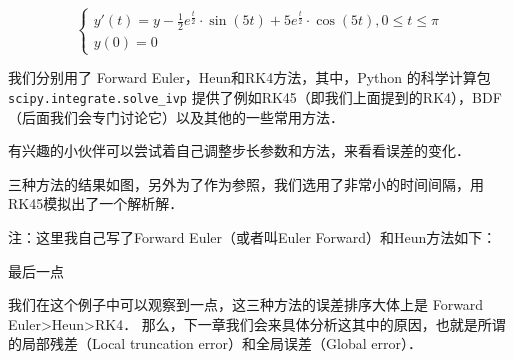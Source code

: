 \begin{equation}
\begin{cases}
 y'(t) = y-\frac{1}{2}e^{\frac{t}{2}}\cdot\sin(5t)+5e^{\frac{t}{2}}\cdot\cos(5t), 0\le t\le \pi\\     y(0)=0
\end{cases}
\end{equation}

我们分别用了 Forward Euler，Heun和RK4方法，其中，Python 的科学计算包 \verb|scipy.integrate.solve_ivp|   提供了例如RK45（即我们上面提到的RK4），BDF（后面我们会专门讨论它）以及其他的一些常用方法．

有兴趣的小伙伴可以尝试着自己调整步长参数和方法，来看看误差的变化．


三种方法的结果如图，另外为了作为参照，我们选用了非常小的时间间隔，用RK45模拟出了一个解析解．

注：这里我自己写了Forward Euler（或者叫Euler Forward）和Heun方法如下：


    
最后一点

我们在这个例子中可以观察到一点，这三种方法的误差排序大体上是 Forward Euler>Heun>RK4． 那么，下一章我们会来具体分析这其中的原因，也就是所谓的局部残差（Local truncation error）和全局误差（Global error）．
